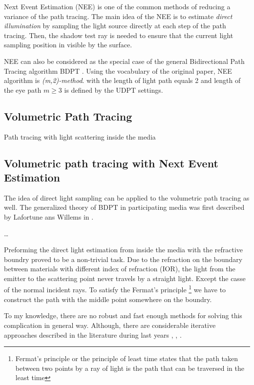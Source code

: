 Next Event Estimation (\gls{NEE}) is one of the common methods of reducing a
variance of the path tracing. The main idea of the \gls{NEE} is to estimate
\textit{direct illumination} by sampling the light source directly at each step
of the path tracing. Then, the shadow test ray is needed to ensure that the
current light sampling position in visible by the surface.

\gls{NEE} can also be considered as the special case of the general
Bidirectional Path Tracing algorithm \gls{BDPT} \cite{Veach:94:BDPT}.
Using the vocabulary of the original paper, NEE algorithm is
\textit{(m,2)-method}. with the length of light path equals 2 and length of the
eye path $m\geq3$ is defined by the \gls{UDPT} settings.

\subsection{Volumetric Path Tracing}
Path tracing with light scattering inside the media

\subsection{Volumetric path tracing with Next Event Estimation}
The idea of direct light sampling can be applied to the volumetric path tracing
as well.
The generalized theory of \gls{BDPT} in participating media was first described
by Lafortune ans Willems in \cite{Lafortune:1996:RPM:275458.275468}. 

\ldots

Preforming the direct light estimation from inside the media with the refractive
boundry proved to be a non-trivial task.
Due to the refraction on the boundary between materials with different index of
refraction (\gls{IOR}), the light from the emitter to the scattering point never
travels by a straight light. Except the casse of the normal incident rays. To
satisfy the Fermat's principle
\footnote{Fermat's principle or the principle of least time states that the path
taken between two points by a ray of light is the path that can be traversed in
the least time} we have to construct the path with the middle point somewhere on
the boundry.

To my knowledge, there are no robust and fast enough methods for solving this
complication in general way. Although, there are considerable iterative
approaches described in the literature during last years
\cite{holzschuch:hal-01083246}, \cite{10.1111:cgf.12681}, \cite{Koerner2016}.

